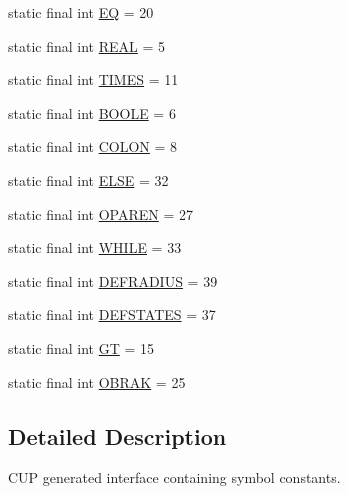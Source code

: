 \begin{DoxyCompactItemize}
static final int \hyperlink{interfacecas_1_1parser_1_1_mata_sym_af1e75e94c4ebfaaeab17f750df15e043}{E\-Q} = 20
\item 
static final int \hyperlink{interfacecas_1_1parser_1_1_mata_sym_aba178cc8282557287b4f572073a9ee06}{R\-E\-A\-L} = 5
\item 
static final int \hyperlink{interfacecas_1_1parser_1_1_mata_sym_a9c8b5d0a28df85b64c4da297faa654a2}{T\-I\-M\-E\-S} = 11
\item 
static final int \hyperlink{interfacecas_1_1parser_1_1_mata_sym_a4735b3577b2c366f65398d19ba3f9ce1}{B\-O\-O\-L\-E} = 6
\item 
static final int \hyperlink{interfacecas_1_1parser_1_1_mata_sym_ae39b0a9c27d7b2a14b28c231d0237050}{C\-O\-L\-O\-N} = 8
\item 
static final int \hyperlink{interfacecas_1_1parser_1_1_mata_sym_acb97cde863bc0db0a34fe666996f9e02}{E\-L\-S\-E} = 32
\item 
static final int \hyperlink{interfacecas_1_1parser_1_1_mata_sym_a8316b7ca32bde1351cffa20120866c66}{O\-P\-A\-R\-E\-N} = 27
\item 
static final int \hyperlink{interfacecas_1_1parser_1_1_mata_sym_ac3726039e2316f3dc8cb4c9ec5fe870d}{W\-H\-I\-L\-E} = 33
\item 
static final int \hyperlink{interfacecas_1_1parser_1_1_mata_sym_aefc3a1da4c4aedaf734e1df4796025fa}{D\-E\-F\-R\-A\-D\-I\-U\-S} = 39
\item 
static final int \hyperlink{interfacecas_1_1parser_1_1_mata_sym_a6e17720943eba3144d48cd99c395d13e}{D\-E\-F\-S\-T\-A\-T\-E\-S} = 37
\item 
static final int \hyperlink{interfacecas_1_1parser_1_1_mata_sym_a54dfe3bfe362a0e48ade0658662dc6bf}{G\-T} = 15
\item 
static final int \hyperlink{interfacecas_1_1parser_1_1_mata_sym_a8a33d553d8ee1849a65094ef9ed5fad0}{O\-B\-R\-A\-K} = 25
\end{DoxyCompactItemize}


\subsection{Detailed Description}
C\-U\-P generated interface containing symbol constants. 

